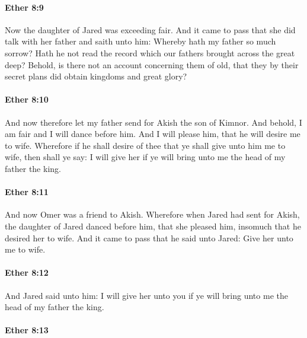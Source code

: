 		\paragraph{Ether 8:9} %
			\label{ETHER-8-9}

			Now the daughter of Jared was exceeding fair.
			And it came to pass that she did talk with her father and saith unto him:
			Whereby hath my father so much sorrow?
			Hath he not read the record which our fathers brought across the great deep?
			Behold, is there not an account concerning them of old,
			that they by their secret plans did obtain kingdoms and great glory?

		\paragraph{Ether 8:10} %
			\label{ETHER-8-10}

			And now therefore let my father send for Akish the son of Kimnor.
			And behold, I am fair and I will dance before him.
			And I will please him, that he will desire me to wife.
			Wherefore if he shall desire of thee
			that ye shall give unto him me to wife,
			then shall ye say:
			I will give her
			if ye will bring unto me the head of my father the king.

		\paragraph{Ether 8:11} %
			\label{ETHER-8-11}

			And now Omer was a friend to Akish.
			Wherefore when Jared had sent for Akish,
			the daughter of Jared danced before him,
			that she pleased him,
			insomuch that he desired her to wife.
			And it came to pass that he said unto Jared:
			Give her unto me to wife.

		\paragraph{Ether 8:12} %
			\label{ETHER-8-12}

			And Jared said unto him:
			I will give her unto you
			if ye will bring unto me the head of my father the king.

		\paragraph{Ether 8:13} %
			\label{ETHER-8-13}

